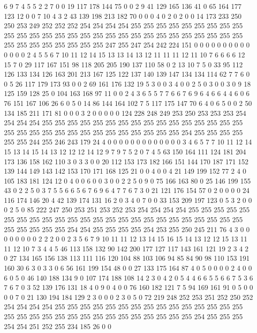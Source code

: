 6 9 7 4 5 5 2 2 7 0 0 19 117 178 144 75 0 0 2 9
41 129 165 136 41 0 65 164 177 123 12 0 0 7 10 4 3 2 43 139
198 213 182 70 0 0 0 4 0 2 0 2 0 0 14 173 233 250 250 253
249 252 252 252 254 254 254 254 255 255 255 255 255 255 255 255 255 255 255 255
255 255 255 255 255 255 255 255 255 255 255 255 255 255 255 255 255 255 255 255
255 255 255 255 247 255 247 254 242 224 151 0 0 0 0 0 0 0 0 0
0 0 0 0 0 2 4 5 5 6 7 10 11 12 14 15 13 13 14 13
12 11 11 11 12 11 10 7 6 6 6 6 12 15 7 0 29 117 167 151
98 118 205 205 190 137 110 58 0 2 13 10 7 5 0 33 95 112 126 133
134 126 163 201 213 167 125 122 137 140 139 147 134 134 114 62 7 7 6 0
0 5 26 117 179 173 93 0 0 2 69 161 176 132 19 5 3 0 0 3
4 0 0 2 5 0 3 0 0 3 0 9 18 125 159 128 25 0 104 163
168 97 11 0 0 2 4 3 6 5 5 7 7 6 6 7 6 9 6 4
6 6 4 4 6 0 6 76 151 167 106 26 6 0 5 0 14 86 144 164
102 7 5 117 175 147 70 6 4 0 6 5 0 0 2 50 134 185 211 171
81 0 0 0 3 2 0 0 0 0 0 124 228 248 249 253 250 253 253 253
254 254 254 254 255 255 255 255 255 255 255 255 255 255 255 255 255 255 255 255
255 255 255 255 255 255 255 255 255 255 255 255 255 255 254 255 255 255 255 255
255 244 255 246 243 179 24 4 0 0 0 0 0 0 0 0 0 0 0 0
0 3 4 6 5 7 7 10 11 12 14 15 13 14 15 14 13 12 12 12
14 12 9 7 9 7 5 2 0 7 4 5 63 150 164 111 124 181 204 173
136 158 162 110 3 0 3 3 0 0 20 112 153 173 182 166 151 144 170 187
171 152 139 144 149 143 142 153 170 171 168 125 21 0 0 4 0 0 4 21
149 199 152 77 2 4 0 105 183 181 124 12 0 4 0 0 6 0 0 3
0 0 2 2 5 0 9 0 75 166 163 80 0 25 146 199 155 43 0 2
2 5 0 3 7 5 5 6 6 5 6 7 6 9 6 4 7 7 6 7
3 0 21 121 176 154 57 0 2 0 0 0 0 24 116 174 146 20 4 42
139 174 131 16 2 0 3 4 0 7 0 0 33 153 209 197 123 0 5 3
2 0 0 0 2 5 0 85 222 247 250 253 251 253 252 253 254 254 254 254
255 255 255 255 255 255 255 255 255 255 255 255 255 255 255 255 255 255 255 255
255 255 255 255 255 255 255 255 255 254 254 255 255 255 255 254 253 255 250 245
211 76 4 3 0 0 0 0 0 0 0 0 2 2 2 0 0 2 3 5
6 7 9 10 11 11 12 13 14 15 16 15 14 13 12 12 15 13 11 11
12 10 7 3 4 4 5 46 113 158 132 90 142 200 177 127 117 143 161 121
19 2 3 4 2 0 27 134 165 156 138 113 111 116 120 104 88 103 106 94
85 84 90 98 110 153 191 160 30 6 3 0 3 3 0 6 56 161 199 154
48 0 0 27 133 175 164 87 4 0 5 0 0 0 0 2 4 0 0 6
0 5 0 46 140 188 134 9 0 107 174 188 108 14 2 3 0 4 2 0
5 4 4 6 6 5 5 6 6 7 5 3 6 7 6 7 0 3 52 139
176 131 18 4 0 9 0 4 0 0 76 160 182 121 7 5 94 169 161 91
0 5 0 0 0 0 7 0 21 130 194 184 129 2 3 0 0 0 2 3
0 5 0 72 219 248 252 253 251 252 250 252 254 254 254 254 255 255 255 255
255 255 255 255 255 255 255 255 255 255 255 255 255 255 255 255 255 255 255 255
255 255 255 255 255 255 254 255 255 255 254 254 251 252 255 234 185 26 0 0
